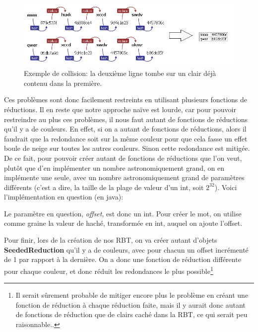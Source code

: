 \documentclass[french,12pt]{article}
\begin{document}
         \begin{figure}[hbt!]
             \centering
             \includegraphics[scale=0.8, frame]{img/rbtcollision.png}
             \caption{Exemple de collision: la deuxième ligne tombe sur un clair déjà contenu dans la première.}
             \label{fig:rbtcollision}
         \end{figure}
         \indent Ces problèmes sont donc facilement restreints en utilisant plusieurs fonctions de réductions. Il en reste que notre approche naïve est lourde, car pour pouvoir restreindre au plus ces problèmes, il nous faut autant de fonctions de réductions qu'il y a de couleurs. En effet, si on a autant de fonctions de réductions, alors il faudrait que la redondance soit sur la même couleur pour que cela fasse un effet boule de neige sur toutes les autres couleurs. Sinon cette redondance est mitigée.
         \newline
         \indent De ce fait, pour pouvoir créer autant de fonctions de réductions que l'on veut, plutôt que d'en implémenter un nombre astronomiquement grand, on en implémente une seule, avec un nombre astronomiquement grand de paramètres différents (c'est a dire, la taille de la plage de valeur d'un int, soit $2^{32}$).
         \newline
         Voici l'implémentation en question (en java):
         

         Le paramètre en question, \textit{offset}, est donc un int. Pour créer le mot, on utilise comme graine la valeur de haché, transformée en int, auquel on ajoute l'offset.

         \newline
         \indent Pour finir, lors de la création de nos RBT, on va créer autant d'objets \textbf{SeededReduction} qu'il y a de couleurs, avec pour chacun un offset incrémenté de 1 par rapport à la dernière. On a donc une fonction de réduction différente pour chaque couleur, et donc réduit les redondances le plus possible\footnote{Il serait sûrement probable de mitiger encore plus le problème en créant une fonction de réduction à chaque réduction faite, mais il y aurait donc autant de fonctions de réduction que de clairs caché dans la RBT, ce qui serait peu raisonnable..}
\end{document}
